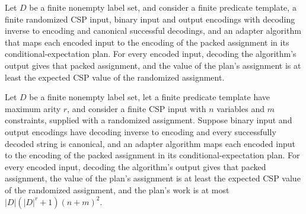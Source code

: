 \begin{theorem}
\label{FABL.ConditionalExpectationPolytimeAdapter.decoded_output_value_ge_expected}
\leanok
{}
Let $D$ be a finite nonempty label set, and consider a finite predicate template, a
finite randomized CSP input, binary input and output encodings with decoding inverse to
encoding and canonical successful decodings, and an adapter algorithm that maps each
encoded input to the encoding of the packed assignment in its conditional-expectation
plan. For every encoded input, decoding the algorithm's output gives that packed
assignment, and the value of the plan's assignment is at least the expected CSP value of
the randomized assignment.
\end{theorem}

\begin{theorem}
\label{FABL.ConditionalExpectationPolytimeAdapter.decoded_output_correct_and_work_le_polynomial}
\leanok
{}
Let $D$ be a finite nonempty label set, let a finite predicate template have maximum
arity $r$, and consider a finite CSP input with $n$ variables and $m$ constraints,
supplied with a randomized assignment. Suppose binary input and output encodings have
decoding inverse to encoding and every successfully decoded string is canonical, and an
adapter algorithm maps each encoded input to the encoding of the packed assignment in
its conditional-expectation plan. For every encoded input, decoding the algorithm's
output gives that packed assignment, the value of the plan's assignment is at least the
expected CSP value of the randomized assignment, and the plan's work is at most
$|D|(|D|^r+1)(n+m)^2$.
\end{theorem}
